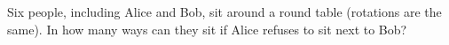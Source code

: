 Six people, including Alice and Bob, sit around a round table (rotations are the same). In how many ways can they sit if Alice refuses to sit next to Bob?
